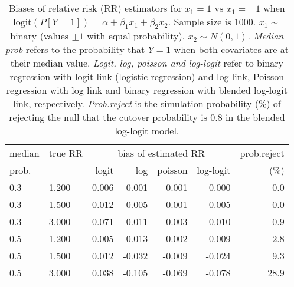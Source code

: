 \documentclass[12pt,a4paper]{article}
\begin{document}
\begin{table}[H] 
\small\sf\centering 
\caption{Biases of relative risk (RR) estimators for $x_1=1$ vs $x_1=-1$ when $\mbox{logit}(P[Y=1])=\alpha+\beta_1 x_1 + \beta_2 x_2$. Sample size is 1000. $x_1 \sim $binary (values $\pm 1$ with equal probability), $x_2 \sim N(0,1)$. {\it Median prob} refers to the probability that $Y=1$ when both covariates are at their median value. {\it Logit, log, poisson and log-logit} refer to binary regression with logit link (logistic regression) and log link, Poisson regression with log link and binary regression with blended log-logit link, respectively. {\it Prob.reject} is the simulation probability (\%) of rejecting the null that the cutover probability is $0.8$ in the blended log-logit model.} 
\begin{tabular}{llrrrrr} 
\toprule 
median & true RR & \multicolumn{4}{c}{bias of estimated RR} & prob.reject \\ 
prob. & & logit & log & poisson & log-logit  & (\%) \\ \midrule 
0.3 & 1.200 & 0.006 & -0.001 &  0.001 &  0.000 &  0.0 \\  
0.3 & 1.500 & 0.012 & -0.005 & -0.001 & -0.005 &  0.0 \\  
0.3 & 3.000 & 0.071 & -0.011 &  0.003 & -0.010 &  0.9 \\  
0.5 & 1.200 & 0.005 & -0.013 & -0.002 & -0.009 &  2.8 \\  
0.5 & 1.500 & 0.012 & -0.032 & -0.009 & -0.024 &  9.3 \\  
0.5 & 3.000 & 0.038 & -0.105 & -0.069 & -0.078 & 28.9 \\  
\bottomrule 
\end{tabular} 
\end{table} 
\end{document}

